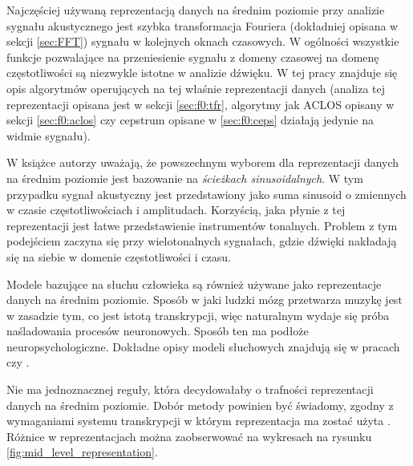 \documentclass[12pt,a4paper,twoside]{mwart}
\begin{document}
Najczęściej używaną reprezentacją danych na średnim poziomie przy analizie sygnału akustycznego jest szybka transformacja Fouriera (dokładniej opisana w sekcji \ref{sec:FFT}) sygnału w kolejnych oknach czasowych. W ogólności wszystkie funkcje pozwalające na przeniesienie sygnału z domeny czasowej na domenę częstotliwości są niezwykle istotne w analizie dźwięku. W tej pracy znajduje się opis algorytmów operujących na tej właśnie reprezentacji danych (analiza tej reprezentacji opisana jest w sekcji \ref{sec:f0:tfr}, algorytmy jak ACLOS opisany w sekcji \ref{sec:f0:aclos} czy cepstrum opisane w \ref{sec:f0:ceps} działają jedynie na widmie sygnału).

W książce 
\cite[13-17]{Transcription:Anssi:SignalProcessingMethods}
 autorzy uważają, że powszechnym wyborem dla reprezentacji danych na średnim poziomie jest bazowanie na \textit{ścieżkach sinusoidalnych}. W tym przypadku sygnał akustyczny jest przedstawiony jako suma sinusoid o zmiennych w czasie częstotliwościach i amplitudach. Korzyścią, jaka płynie z tej reprezentacji jest łatwe przedstawienie instrumentów tonalnych. Problem z tym podejściem zaczyna się przy wielotonalnych sygnałach, gdzie dźwięki nakładają się na siebie w domenie częstotliwości i czasu. 

Modele bazujące na słuchu człowieka są również używane jako reprezentacje danych na średnim poziomie. Sposób w jaki ludzki mózg przetwarza muzykę jest w zasadzie tym, co jest istotą transkrypcji, więc naturalnym wydaje się próba naśladowania procesów neuronowych. Sposób ten ma podłoże neuropsychologiczne. Dokładne opisy modeli słuchowych znajdują się w pracach \cite{Transcription:Karjalainen:MultipitchAnalysisModel} czy \cite{Transcription:Zatorre:AuditoryCortex}.

Nie ma jednoznacznej reguły, która decydowałaby o trafności reprezentacji danych na średnim poziomie. Dobór metody powinien być świadomy, zgodny z wymaganiami systemu transkrypcji w którym reprezentacja ma zostać użyta 
\cite[13-15]{Transcription:Anssi:SignalProcessingMethods}
. Różnice w reprezentacjach można zaobserwować na wykresach na rysunku \ref{fig:mid_level_representation}. 
\end{document}
